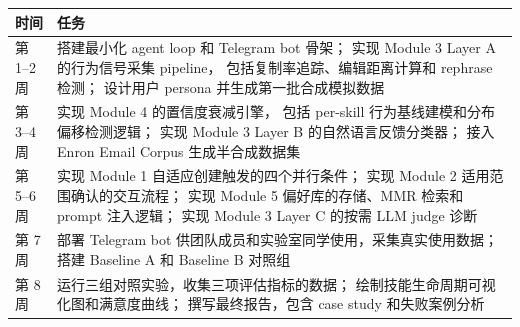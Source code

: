 \documentclass[12pt,a4paper]{article}
\begin{document}
	\begin{table}[H]
		\centering
		\small
		\begin{tabular}{@{}p{2.5cm}p{11cm}@{}}
			\toprule
			\textbf{时间} & \textbf{任务} \\
			\midrule
			第 1--2 周 &
			搭建最小化 agent loop 和 Telegram bot 骨架；
			实现 Module 3 Layer A 的行为信号采集 pipeline，
			包括复制率追踪、编辑距离计算和 rephrase 检测；
			设计用户 persona 并生成第一批合成模拟数据 \\
			\midrule
			第 3--4 周 &
			实现 Module 4 的置信度衰减引擎，
			包括 per-skill 行为基线建模和分布偏移检测逻辑；
			实现 Module 3 Layer B 的自然语言反馈分类器；
			接入 Enron Email Corpus 生成半合成数据集 \\
			\midrule
			第 5--6 周 &
			实现 Module 1 自适应创建触发的四个并行条件；
			实现 Module 2 适用范围确认的交互流程；
			实现 Module 5 偏好库的存储、MMR 检索和 prompt 注入逻辑；
			实现 Module 3 Layer C 的按需 LLM judge 诊断 \\
			\midrule
			第 7 周 &
			部署 Telegram bot 供团队成员和实验室同学使用，采集真实使用数据；
			搭建 Baseline A 和 Baseline B 对照组 \\
			\midrule
			第 8 周 &
			运行三组对照实验，收集三项评估指标的数据；
			绘制技能生命周期可视化图和满意度曲线；
			撰写最终报告，包含 case study 和失败案例分析 \\
			\bottomrule
		\end{tabular}
	\end{table}
	
\end{document}
